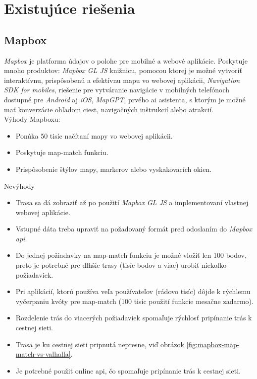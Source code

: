 \section{Existujúce riešenia}
\subsection{Mapbox}

\indent \indent \textit{Mapbox} je platforma údajov o polohe pre mobilné a webové aplikácie\cite{mapbox}. Poskytuje mnoho produktov: \textit{Mapbox GL JS} knižnicu, pomocou ktorej je možné vytvoriť interaktívnu, prispôsobenú a efektívnu mapu vo webovej aplikácii\cite{mapbox_gljs}, \textit{Navigation SDK for mobiles}, riešenie pre vytváranie navigácie v mobilných telefónoch dostupné pre \textit{Android} aj \textit{iOS}\cite{mapbox_mobile_navigation},  \textit{MapGPT}, prvého \acrshort{ai} asistenta, s ktorým je možné mať konverzácie ohľadom ciest, navigačných inštrukcií alebo atrakcií\cite{mapbox_mapgpt}. \\
Výhody Mapboxu:
\begin{itemize}
  \item Ponúka 50 tisíc načítaní mapy vo webovej aplikácii.
  \item Poskytuje map-match funkciu.
  \item Prispôsobenie štýlov mapy, markerov alebo vyskakovacích okien.
\end{itemize}
Nevýhody
\begin{itemize}
  \item Trasa sa dá zobraziť až po použití \textit{Mapbox GL JS} a implementovaní vlastnej webovej aplikácie.
  \item Vstupné dáta treba upraviť na požadovaný formát pred odoslaním do \textit{Mapbox \acrshort{api}}.
  \item Do jednej požiadavky na map-match funkciu je možné vložiť len 100 bodov, preto je potrebné pre dlhšie trasy (tisíc bodov a viac) urobiť niekoľko požiadaviek. 
  \item Pri aplikácií, ktorú používa veľa používateľov (rádovo tisíc) dôjde k rýchlemu vyčerpaniu kvóty pre map-match (100 tisíc použití funkcie mesačne zadarmo). 
  \item Rozdelenie trás do viacerých požiadaviek spomaľuje rýchlosť pripínanie trás k cestnej sieti.
  \item Trasa je ku cestnej sieti pripnutá nepresne, viď obrázok \ref{fig:mapbox-map-match-vs-valhalla}.
  \item Je potrebné použiť online \acrshort{api}, čo spomaľuje pripínanie trás k cestnej sieti.
\end{itemize}
